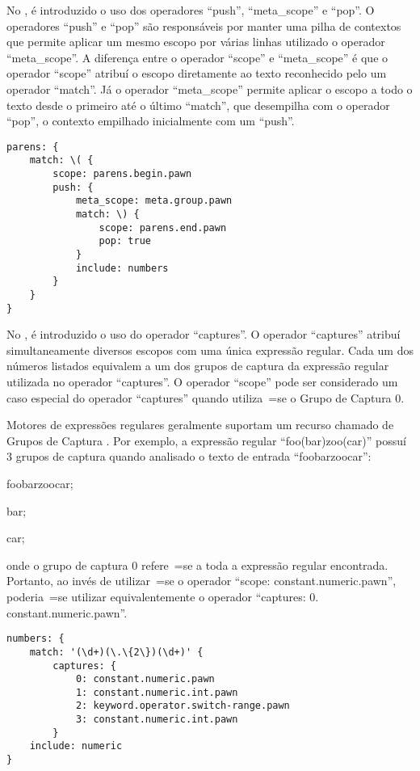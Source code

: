 No ,
é introduzido o uso dos operadores ``push'',
``meta\_scope'' e
``pop''.
O operadores ``push'' e
``pop'' são responsáveis por manter uma pilha de contextos que permite aplicar um mesmo escopo por várias linhas utilizado o operador ``meta\_scope''.
A diferença entre o operador ``scope'' e
``meta\_scope'' é que o operador ``scope'' atribuí o escopo diretamente ao texto reconhecido pelo um operador ``match''.
Já o operador ``meta\_scope'' permite aplicar o escopo a todo o texto desde o primeiro até o último ``match'',
que desempilha com o operador ``pop'',
o contexto empilhado inicialmente com um ``push''.
\begin{lstlisting}[caption={Exemplo de Gramática, Contextos},label={exemploDeGramaticaPawn2},style=yaml_style]
parens: {
    match: \( {
        scope: parens.begin.pawn
        push: {
            meta_scope: meta.group.pawn
            match: \) {
                scope: parens.end.pawn
                pop: true
            }
            include: numbers
        }
    }
}
\end{lstlisting}

No ,
é introduzido o uso do operador ``captures''.
O operador ``captures'' atribuí simultaneamente diversos escopos com uma única expressão regular.
Cada um dos números listados equivalem a um dos grupos de captura da expressão regular utilizada no operador ``captures''.
O operador ``scope'' pode ser considerado um caso especial do operador ``captures'' quando utiliza~=se o Grupo de Captura 0.

Motores de expressões regulares geralmente suportam um recurso chamado de Grupos de Captura \cite{expressionGrammarsWithRegexLikeCaptures}.
Por exemplo,
a expressão regular ``foo(bar)zoo(car)'' possuí 3 grupos de captura quando analisado o texto de entrada ``foobarzoocar'':
\begin{inparaenum}[1)]\setcounter{enumi}{-1}
\item foobarzoocar;
\item bar;
\item car;
\end{inparaenum}%
onde o grupo de captura 0 refere~=se a toda a expressão regular encontrada.
Portanto,
ao invés de utilizar~=se o operador ``scope:
constant.numeric.pawn'',
poderia~=se utilizar equivalentemente o operador ``captures:
0.
constant.numeric.pawn''.
\begin{lstlisting}[caption={Exemplo de Gramática, Grupos de Captura},label={exemploDeGramaticaPawn3},style=yaml_style]
numbers: {
    match: '(\d+)(\.\{2\})(\d+)' {
        captures: {
            0: constant.numeric.pawn
            1: constant.numeric.int.pawn
            2: keyword.operator.switch-range.pawn
            3: constant.numeric.int.pawn
        }
    include: numeric
}
\end{lstlisting}

